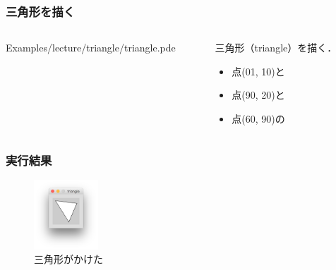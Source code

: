 \documentclass[dvipdfmx]{beamer}
\begin{document}
        \begin{frame}
            \frametitle{三角形を描く}
            \begin{columns}[c]
                \begin{column}{0.50\textwidth}
                    \tiny
                    Examples/lecture/triangle/triangle.pde
                    \scriptsize
                \end{column}
                \begin{column}{0.50\textwidth}
                    \begin{block}{三角形（triangle）を描く．}
                        \begin{itemize}
                            \item 点(01, 10)と
                            \item 点(90, 20)と
                            \item 点(60, 90)の
                        \end{itemize}
                    \end{block}
                \end{column}
            \end{columns}
        \end{frame}

        \begin{frame}
            \frametitle{実行結果}
                \begin{figure}[htb]
                    \includegraphics[width=24mm]{images/05.png}
                    \caption{三角形がかけた}
                    \label{fig:05}
                \end{figure}
        \end{frame}
\end{document}
